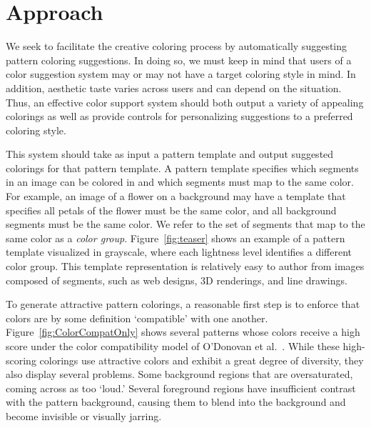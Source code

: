 \section{Approach}
\label{sec:approach}

We seek to facilitate the creative coloring process by automatically suggesting pattern coloring suggestions. In doing so, we must keep in mind that users of a color suggestion system may or may not have a target coloring style in mind. In addition, aesthetic taste varies across users and can depend on the situation. Thus, an effective color support system should both output a variety of appealing colorings as well as provide controls for personalizing suggestions to a preferred coloring style.

This system should take as input a pattern template and output suggested colorings for that pattern template. A pattern template specifies which segments in an image can be colored in and which segments must map to the same color. For example, an image of a flower on a background may have a template that specifies all petals of the flower must be the same color, and all background segments must be the same color. We refer to the set of segments that map to the same color as a \emph{color group}. Figure~\ref{fig:teaser} shows an example of a pattern template visualized in grayscale, where each lightness level identifies a different color group. This template representation is relatively easy to author from images composed of segments, such as web designs, 3D renderings, and line drawings.

To generate attractive pattern colorings, a reasonable first step is to enforce that colors are by some definition `compatible' with one another. Figure~\ref{fig:ColorCompatOnly} shows several patterns whose colors receive a high score under the color compatibility model of O'Donovan et al.~. While these high-scoring colorings use attractive colors and exhibit a great degree of diversity, they also display several problems. Some background regions that are oversaturated, coming across as too `loud.' Several foreground regions have insufficient contrast with the pattern background, causing them to blend into the background and become invisible or visually jarring.

